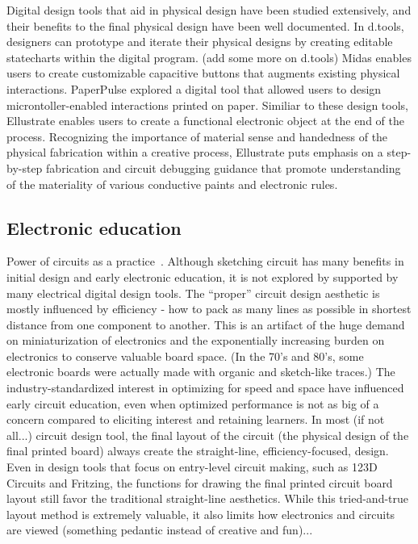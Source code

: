 \documentclass{sigchi}
\begin{document}
Digital design tools that aid in physical design have been studied extensively, and their benefits to the final physical design have been well documented. In d.tools,  designers can prototype and iterate their physical designs by creating editable statecharts within the digital program. (add some more on d.tools) Midas enables users to create customizable capacitive buttons that augments existing physical interactions. PaperPulse explored a digital tool that allowed users to design microntoller-enabled interactions printed on paper. Similiar to these design tools, Ellustrate enables users to create a functional electronic object at the end of the process. Recognizing the importance of material sense and handedness of the physical fabrication within a creative process, Ellustrate puts emphasis on a step-by-step fabrication and circuit debugging guidance that promote understanding of the materiality of various conductive paints and electronic rules. 


\subsection{Electronic education}
Power of circuits as a practice~\cite{collins_solders_2008}.
Although sketching circuit has many benefits in initial design and early electronic education, it is not explored by supported by many electrical digital design tools. The “proper” circuit design aesthetic is mostly influenced by efficiency - how to pack as many lines as possible in shortest distance from one component to another. This is an artifact of the huge demand on miniaturization of electronics and the exponentially increasing burden on electronics to conserve valuable board space. (In the 70’s and 80’s, some electronic boards were actually made with organic and sketch-like traces.) The industry-standardized interest in optimizing for speed and space have influenced early circuit education, even when optimized performance is not as big of a concern compared to eliciting interest and retaining learners. In most (if not all...) circuit design tool, the final layout of the circuit (the physical design of the final printed board) always create the straight-line, efficiency-focused, design. Even in design tools that focus on entry-level circuit making, such as 123D Circuits and Fritzing, the functions for drawing the final printed circuit board layout still favor the traditional straight-line aesthetics. While this tried-and-true layout method is extremely valuable, it also limits how electronics and circuits are viewed (something pedantic instead of creative and fun)...
\end{document}
